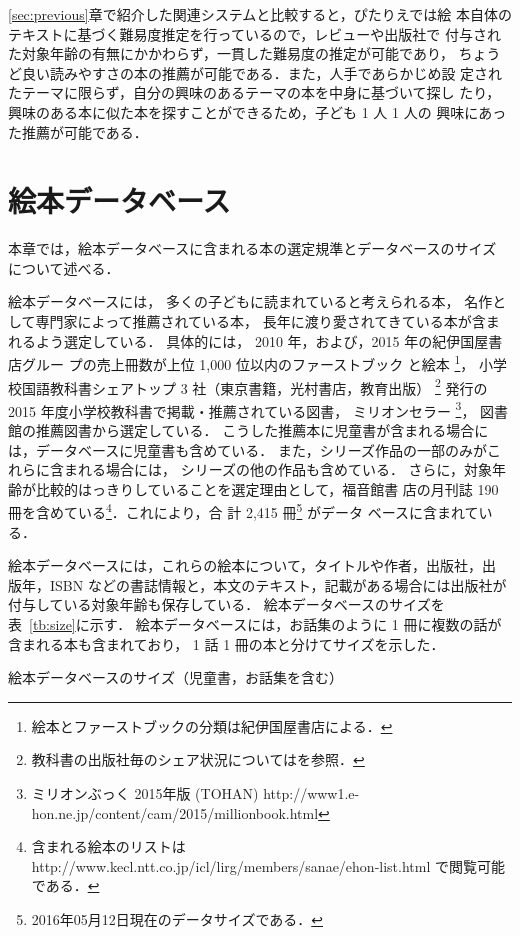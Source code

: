 \documentclass[japanese]{jnlp_1.4}
\begin{document}
\ref{sec:previous}章で紹介した関連システムと比較すると，ぴたりえでは絵
本自体のテキストに基づく難易度推定を行っているので，レビューや出版社で
付与された対象年齢の有無にかかわらず，一貫した難易度の推定が可能であり，
ちょうど良い読みやすさの本の推薦が可能である．また，人手であらかじめ設
定されたテーマに限らず，自分の興味のあるテーマの本を中身に基づいて探し
たり，興味のある本に似た本を探すことができるため，子ども 1 人 1 人の
興味にあった推薦が可能である．


\section{絵本データベース}\label{sec:ehon-db}

本章では，絵本データベースに含まれる本の選定規準とデータベースのサイズ
について述べる．

絵本データベースには，
多くの子どもに読まれていると考えられる本，
名作として専門家によって推薦されている本，
長年に渡り愛されてきている本が含まれるよう選定している．
具体的には，
2010 年，および，2015 年の紀伊国屋書店グルー
プの売上冊数が上位 1,000 位以内のファーストブック
と絵本
\footnote{絵本とファーストブックの分類は紀伊国屋書店による．}，
小学校国語教科書シェアトップ 3 社（東京書籍，光村書店，教育出版）
\footnote{教科書の出版社毎のシェア状況についてはを参照．}
発行の 2015 年度小学校教科書で掲載・推薦されている図書，
ミリオンセラー
\footnote{ミリオンぶっく 2015年版 (TOHAN) http://www1.e-hon.ne.jp/content/cam/2015/millionbook.html}，
図書館の推薦図書から選定している．
こうした推薦本に児童書が含まれる場合には，データベースに児童書も含めている．
また，シリーズ作品の一部のみがこれらに含まれる場合には，
シリーズの他の作品も含めている．
さらに，対象年齢が比較的はっきりしていることを選定理由として，福音館書
店の月刊誌 190 冊を含めている\footnote{含まれる絵本のリストは http://www.kecl.ntt.co.jp/icl/lirg/members/sanae/ehon-list.html で閲覧可能である．}．これにより，合
計 2,415 冊\footnote{2016年05月12日現在のデータサイズである．} がデータ
ベースに含まれている．


絵本データベースには，これらの絵本について，タイトルや作者，出版社，出
版年，ISBN などの書誌情報と，本文のテキスト，記載がある場合には出版社が
付与している対象年齢も保存している．
絵本データベースのサイズを表~\ref{tb:size}に示す．
絵本データベースには，お話集のように 1 冊に複数の話が含まれる本も含まれており，
1 話  1 冊の本と分けてサイズを示した．


\begin{table}[t]
 \caption{絵本データベースのサイズ（児童書，お話集を含む）}
\label{tb:size}

\end{table}
\end{document}
